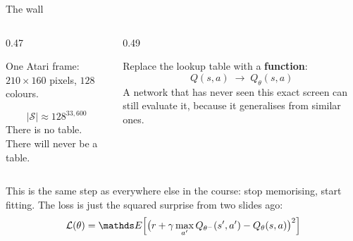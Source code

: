 \documentclass[aspectratio=169]{beamer}
\begin{document}
\begin{frame}{The wall}
  \begin{columns}[T]
    \begin{column}{0.47\textwidth}
      \begin{tcolorbox}[colback=armred!8, colframe=armred, boxrule=0.6pt, arc=2pt,
                        title=\textbf{Tabular Q-learning stops here}]
        \small
        One Atari frame: $210 \times 160$ pixels, $128$ colours.

        \vskip 4pt
        \[ |\mathcal{S}| \approx 128^{33{,}600} \]
        \vskip 2pt
        There is no table. There will never be a table.
      \end{tcolorbox}
    \end{column}
    \begin{column}{0.49\textwidth}
      \begin{tcolorbox}[colback=paramgreen!8, colframe=paramgreen, boxrule=0.6pt, arc=2pt,
                        title=\textbf{The move you have made before}]
        \small
        Replace the lookup table with a \textbf{function}:
        \[ Q(s,a) \;\longrightarrow\; Q_\theta(s,a) \]
        \vskip 2pt
        A network that has never seen this exact screen can still evaluate it, because it
        generalises from similar ones.
      \end{tcolorbox}
    \end{column}
  \end{columns}

  \vskip 10pt
  \small
  This is the same step as everywhere else in the course: stop memorising, start fitting. The
  loss is just the squared surprise from two slides ago:
  \[ \mathcal{L}(\theta) = \E\Big[\big(r + \gamma \max_{a'} Q_{\theta^-}(s',a') - Q_\theta(s,a)\big)^2\Big] \]
\end{frame}
\end{document}
